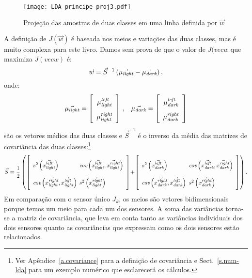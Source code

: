 \begin{figure}
\begin{center}
\texttt{[image: LDA-principe-proj3.pdf]}
\end{center}
\caption{Projeção das amostras de duas classes em uma linha definida por $\vec{w}$}\label{fig.lda-proj}
\end{figure}

A definição de $J(\vec{w})$ é baseada nos meios e variações das duas classes, mas é muito complexa para este livro. Damos sem prova de que o valor de $J(vec{w}$ que maximiza $J(vec{w})$ é:
\begin{equation}
\vec{w} = \vec{S}^{-1}\,(\vec{\mu_{\textit{\scriptsize light}}}-\vec{\mu_{\textit{\scriptsize dark}}})\,,\label{eq.wLDA}
\end{equation}
onde:
\[
\renewcommand{\arraystretch}{1.8}
\vec{\mu_{\sub{light}}}=\left[
\begin{array}{c}\mu_{\sub{light}}^{\sub{left}}\\
\mu_{\sub{light}}^{\sub{right}}\end{array}
\right]\,,\;\;\;
\vec{\mu_{\sub{dark}}}=\left[
\begin{array}{c}\mu_{\sub{dark}}^{\sub{left}}\\
\mu_{\sub{dark}}^{\sub{right}}\end{array}\right]
\]
são os vetores médios das duas classes e $\vec{S}^{-1}$ é o inverso da média das matrizes de covariância das duas classes:\footnote{Ver Apêndice~\ref{a.covariance} para a definição de covariância e Sect.~\ref{s.num-lda} para um exemplo numérico que esclarecerá os cálculos.}
\[
\renewcommand{\arraystretch}{2.5}
\vec{S} = \frac{1}{2}\left(
\left[\begin{array}{l@{\hspace{.4em}}l}
s^2\left(\vec{x^{\sub{left}}_\sub{light}}\right) &
\textit{cov}\left(\vec{x^{\sub{left}}_\sub{light}},\vec{x^{\sub{right}}_\sub{light}}\right)\\
\textit{cov}\left(\vec{x^{\sub{right}}_\sub{light}},\vec{x^{\sub{left}}_\sub{light}}\right)&
s^2\left(\vec{x^{\sub{right}}_\sub{light}}\right)
\end{array}\right]
\!+\!
\left[\begin{array}{l@{\hspace{.5em}}l}
s^2\left(\vec{x^{\sub{left}}_\sub{dark}}\right)&
\textit{cov}\left(\vec{x^{\sub{left}}_\sub{dark}},\vec{x^{\sub{right}}_\sub{dark}}\right)\\
\textit{cov}\left(\vec{x^{\sub{right}}_\sub{dark}},\vec{x^{\sub{left}}_\sub{dark}}\right)&
s^2\left(\vec{x^{\sub{right}}_\sub{dark}}\right)
\end{array}\right]\right).
\]
Em comparação com o sensor único $J_k$, os meios são vetores bidimensionais porque temos um meio para cada um dos sensores. A soma das variâncias torna-se a matriz de covariância, que leva em conta tanto as variâncias individuais dos dois sensores quanto as covariâncias que expressam como os dois sensores estão relacionados.

